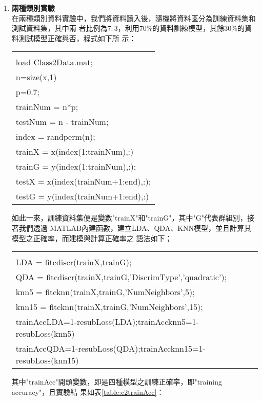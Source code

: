 		\begin{enumerate}
		\item {\textbf{兩種類別實驗}\\
			在兩種類別資料實驗中，我們將資料讀入後，隨機將資料區分為訓練資料集和測試資料集，其中兩				者比例為$7:3$，利用70\%的資料訓練模型，其餘30\%的資料測試模型正確與否，程式如下所					示：			
 			\begin{center}\colorbox{slight}{
				\begin{tabular}{p{}}
					\MJHmarker{\textbf{\color{darkblue}{MATLAB語法 :}}}\\
					load Class2Data.mat;\\
					n=size(x,1)\\
					p=0.7;\\
					trainNum = n*p;\\
					testNum = n - trainNum;\\
					index = randperm(n);\\
					trainX = x(index(1:trainNum),:)\\
					trainG = y(index(1:trainNum),:);\\
					testX = x(index(trainNum+1:end),:);\\
					testG = y(index(trainNum+1:end),:)\\
				\end{tabular}
			}
			\end{center}
			\bigskip	
			如此一來，訓練資料集便是變數"trainX"和"trainG"，其中"G"代表群組別，接著我們透過					MATLAB內建函數，建立LDA、QDA、KNN模型，並且計算其模型之正確率，而建模與計算正確率之				語法如下；
			\begin{center}\colorbox{slight}{
				\begin{tabular}{p{}}
					\MJHmarker{\textbf{\color{darkblue}{MATLAB語法 :}}}\\
					LDA = fitcdiscr(trainX,trainG);\\
					QDA = fitcdiscr(trainX,trainG,'DiscrimType','quadratic');\\
					knn5 = fitcknn(trainX,trainG,'NumNeighbors',5);\\
					knn15 = fitcknn(trainX,trainG,'NumNeighbors',15);\\
					trainAccLDA=1-resubLoss(LDA);trainAccknn5=1-resubLoss(knn5)\\
					trainAccQDA=1-resubLoss(QDA);trainAccknn15=1-resubLoss(knn15)					\end{tabular}
			}
			\end{center}
			其中"trainAcc"開頭變數，即是四種模型之訓練正確率，即"training accuracy"，且實驗結				果如表\ref{table:c2trainAcc}：
}
\end{enumerate}
